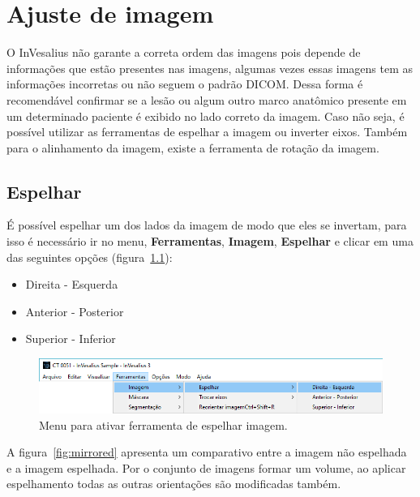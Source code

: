 \chapter{Ajuste de imagem}

O InVesalius não garante a correta ordem das imagens pois depende de informações que estão presentes nas imagens, algumas vezes essas imagens tem as informações incorretas ou não seguem o padrão DICOM. Dessa forma é recomendável confirmar se a lesão ou algum outro marco anatômico presente em um determinado paciente é exibido no lado correto da imagem. Caso não seja, é possível utilizar as ferramentas de espelhar a imagem ou inverter eixos. Também para o alinhamento da imagem, existe a ferramenta de rotação da imagem.

\section{Espelhar}

É possível espelhar um dos lados da imagem de modo que eles se invertam, para isso é necessário ir no menu, \textbf{Ferramentas}, \textbf{Imagem}, \textbf{Espelhar} e clicar em uma das seguintes opções (figura~\ref{fig:menu_img_mirroring_axis_pt}):

\begin{itemize}
	\item Direita - Esquerda
	\item Anterior - Posterior
	\item Superior - Inferior
\end{itemize}

\begin{figure}[!htb]
\centering
\includegraphics[scale=0.4]{../user_guide_figures/invesalius_screen/menu_img_mirroring_axis_pt.png}
\caption{Menu para ativar ferramenta de espelhar imagem.}
\label{fig:menu_img_mirroring_axis_pt}
\end{figure}


A figura~\ref{fig:mirrored} apresenta um comparativo entre a imagem não espelhada e a imagem espelhada. Por o conjunto de imagens formar um volume, ao aplicar espelhamento todas as outras orientações são modificadas também.

